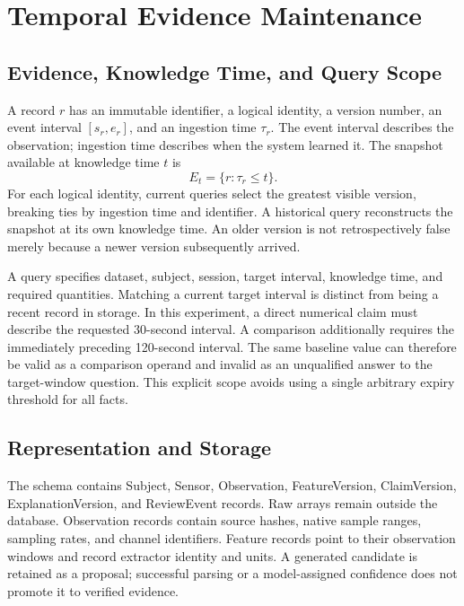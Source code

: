 \section{Temporal Evidence Maintenance}
\label{sec:method}

\subsection{Evidence, Knowledge Time, and Query Scope}

A record $r$ has an immutable identifier, a logical identity, a version number,
an event interval $[s_r,e_r]$, and an ingestion time $\tau_r$. The event interval
describes the observation; ingestion time describes when the system learned it.
The snapshot available at knowledge time $t$ is
\begin{equation}
 E_t=\{r:\tau_r\leq t\}.
\end{equation}
For each logical identity, current queries select the greatest visible version,
breaking ties by ingestion time and identifier. A historical query reconstructs
the snapshot at its own knowledge time. An older version is not retrospectively
false merely because a newer version subsequently arrived.

A query specifies dataset, subject, session, target interval, knowledge time,
and required quantities. Matching a current target interval is distinct from
being a recent record in storage. In this experiment, a direct numerical claim
must describe the requested 30-second interval. A comparison additionally
requires the immediately preceding 120-second interval. The same baseline
value can therefore be valid as a comparison operand and invalid as an
unqualified answer to the target-window question. This explicit scope avoids
using a single arbitrary expiry threshold for all facts.

\subsection{Representation and Storage}

The schema contains Subject, Sensor, Observation, FeatureVersion, ClaimVersion,
ExplanationVersion, and ReviewEvent records. Raw arrays remain outside the
database. Observation records contain source hashes, native sample ranges,
sampling rates, and channel identifiers. Feature records point to their
observation windows and record extractor identity and units. A generated
candidate is retained as a proposal; successful parsing or a model-assigned
confidence does not promote it to verified evidence.

